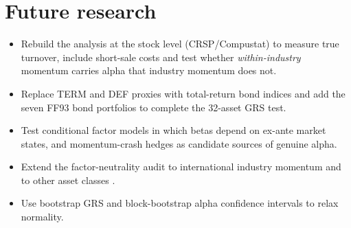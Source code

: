 \documentclass[11pt]{article}
\begin{document}
\section{Future research}
\begin{itemize}
  \item Rebuild the analysis at the stock level (CRSP/Compustat) to measure true turnover, include short-sale costs and test whether \emph{within-industry} momentum carries alpha that industry momentum does not.
  \item Replace TERM and DEF proxies with total-return bond indices and add the seven FF93 bond portfolios to complete the 32-asset GRS test.
  \item Test conditional factor models in which betas depend on ex-ante market states, and momentum-crash hedges \citep{DM2016} as candidate sources of genuine alpha.
  \item Extend the factor-neutrality audit to international industry momentum and to other asset classes \citep{AMP2013}.
  \item Use bootstrap GRS and block-bootstrap alpha confidence intervals to relax normality.
\end{itemize}



\end{document}
